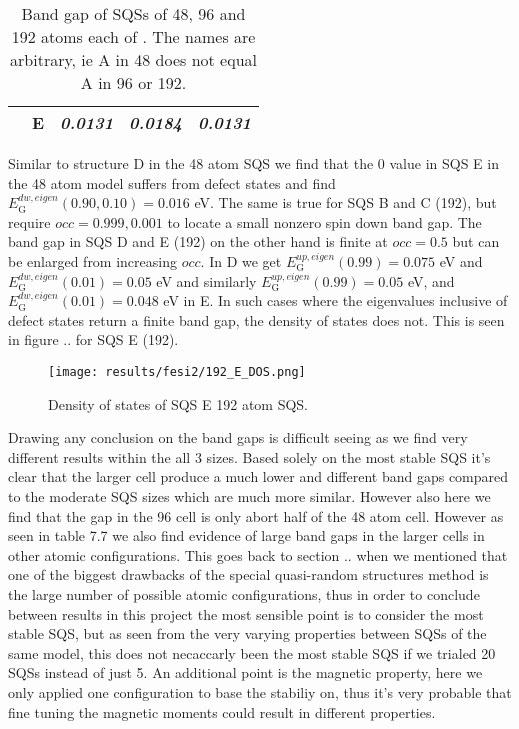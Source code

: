\begin{table}[H]
\begin{tabular}{@{}ccccc@{}}
\multicolumn{1}{c|}{}                     & \textbf{E} & \textit{0.0131}                                                                & \textit{0.0184}                                                                         & \textit{0.0131}                                                                          \\ \bottomrule 
\end{tabular}
\caption{Band gap of SQSs of 48, 96 and 192 atoms each of . The names are arbitrary, ie A in 48 does not equal A in 96 or 192.}
\end{table}

Similar to structure D in the 48 atom SQS we find that the 0 value in SQS E in the 48 atom model suffers from defect states and find $E_\text{G} ^{dw, eigen}(0.90, 0.10) = 0.016$ eV. The same is true for SQS B and C (192), but require $occ = 0.999, 0.001$ to locate a small nonzero spin down band gap. The band gap in SQS D and E (192) on the other hand is finite at $occ = 0.5$ but can be enlarged from increasing $occ$. In D we get $E_\text{G} ^{up, eigen}(0.99) = 0.075$ eV and $E_\text{G} ^{dw, eigen}(0.01) = 0.05$ eV and similarly $E_\text{G} ^{up, eigen}(0.99) = 0.05$ eV, and $E_\text{G} ^{dw, eigen}(0.01) = 0.048$ eV in E. In such cases where the eigenvalues inclusive of defect states return a finite band gap, the density of states does not. This is seen in figure .. for SQS E (192). 

\begin{figure}
\centering
\texttt{[image: results/fesi2/192\_E\_DOS.png]}
\caption{Density of states of SQS E 192 atom SQS.}
\end{figure}    
 
Drawing any conclusion on the band gaps is difficult seeing as we find very different results within the all 3 sizes. Based solely on the most stable SQS it's clear that the larger cell produce a much lower and different band gaps compared to the moderate SQS sizes which are much more similar. However also here we find that the gap in the 96 cell is only abort half of the 48 atom cell. However as seen in table 7.7 we also find evidence of large band gaps in the larger cells in other atomic configurations. This goes back to section .. when we mentioned that one of the biggest drawbacks of the special quasi-random structures method is the large number of possible atomic configurations, thus in order to conclude between results in this project the most sensible point is to consider the most stable SQS, but as seen from the very varying properties between SQSs of the same model, this does not necaccarly been the most stable SQS if we trialed 20 SQSs instead of just 5. An additional point is the magnetic property, here we only applied one configuration to base the stabiliy on, thus it's very probable that fine tuning the magnetic moments could result in different properties.  

